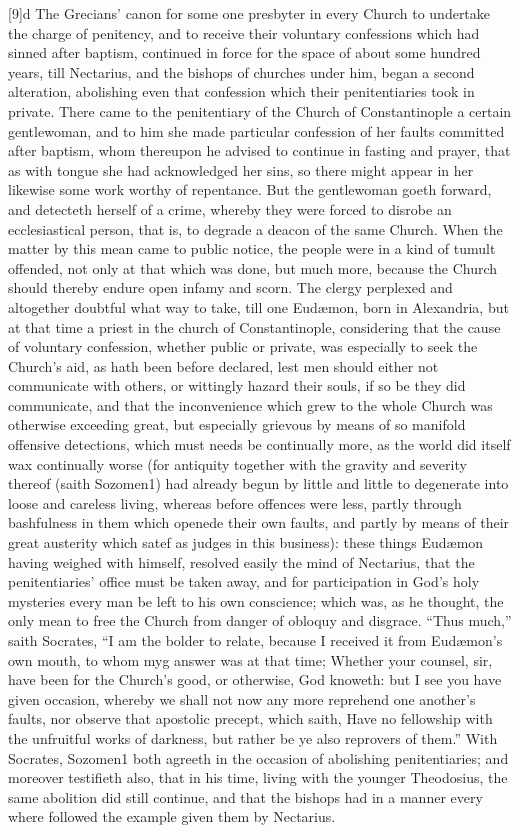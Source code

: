 [9]d The Grecians’ canon for some one presbyter in every Church to undertake the charge of penitency, and to receive their voluntary confessions which had sinned after baptism, continued in force for the space of about some hundred years, till Nectarius, and the bishops of churches under him, began a second alteration, abolishing even that confession which their penitentiaries took in private. There came to the penitentiary of the Church of Constantinople a certain gentlewoman, and to him she made particular confession of her faults committed after baptism, whom thereupon he advised to continue in fasting and prayer, that as with tongue she had acknowledged her sins, so there might appear in her likewise some work worthy of repentance. But the gentlewoman goeth forward, and detecteth herself of a crime, whereby they were forced to disrobe an ecclesiastical person, that is, to degrade a deacon of the same Church. When the matter by this mean came to public notice, the people were in a kind of tumult offended, not only at that which was done,  but much more, because the Church should thereby endure open infamy and scorn. The clergy perplexed and altogether doubtful what way to take, till one Eudæmon, born in Alexandria, but at that time a priest in the church of Constantinople, considering that the cause of voluntary confession, whether public or private, was especially to seek the Church’s aid, as hath been before declared, lest men should either not communicate with others, or wittingly hazard their souls, if so be they did communicate, and that the inconvenience which grew to the whole Church was otherwise exceeding great, but especially grievous by means of so manifold offensive detections, which must needs be continually more, as the world did itself wax continually worse (for antiquity together with the gravity and severity thereof (saith Sozomen1) had already begun by little and little to degenerate into loose and careless living, whereas before offences were less, partly through bashfulness in them which openede their own faults, and partly by means of their great austerity which satef as judges in this business): these things Eudæmon having weighed with himself, resolved easily the mind of Nectarius, that the penitentiaries’ office must be taken away, and for participation in God’s holy mysteries every man be left to his own conscience; which was, as he thought, the only mean to free the Church from danger of obloquy and disgrace. “Thus much,” saith Socrates, “I am the bolder to relate, because I received it from Eudæmon’s own mouth, to whom myg answer was at that time; Whether your counsel, sir, have been for the Church’s good, or otherwise, God knoweth: but I see  you have given occasion, whereby we shall not now any more reprehend one another’s faults, nor observe that apostolic precept, which saith, Have no fellowship with the unfruitful works of darkness, but rather be ye also reprovers of them.” With Socrates, Sozomen1 both agreeth in the occasion of abolishing penitentiaries; and moreover testifieth also, that in his time, living with the younger Theodosius, the same abolition did still continue, and that the bishops had in a manner every where followed the example given them by Nectarius.

